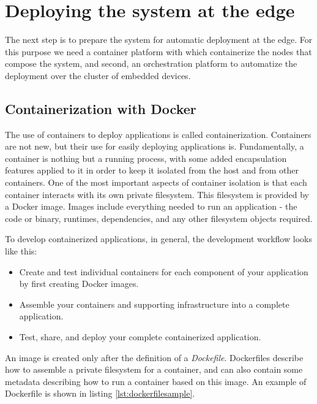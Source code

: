 \section{Deploying the system at the edge}
The next step is to prepare the system for automatic deployment at the edge. For this purpose we need a container platform with which containerize the nodes that compose the system, and second, an orchestration platform to automatize the deployment over the cluster of embedded devices.

\subsection{Containerization with Docker}
The use of containers to deploy applications is called containerization. Containers are not new, but their use for easily deploying applications is.
Fundamentally, a container is nothing but a running process, with some added encapsulation features applied to it in order to keep it isolated from the host and from other containers. One of the most important aspects of container isolation is that each container interacts with its own private filesystem. This filesystem is provided by a Docker image. Images include everything needed to run an application - the code or binary, runtimes, dependencies, and any other filesystem objects required.

To develop containerized applications, in general, the development workflow looks like this:
\begin{itemize}
	\item Create and test individual containers for each component of your application by first creating Docker images.
	\item Assemble your containers and supporting infrastructure into a complete application.
	\item Test, share, and deploy your complete containerized application.
\end{itemize}

An image is created only after the definition of a \textit{Dockefile}. Dockerfiles describe how to assemble a private filesystem for a container, and can also contain some metadata describing how to run a container based on this image. An example of Dockerfile is shown in listing \ref{lst:dockerfilesample}.

